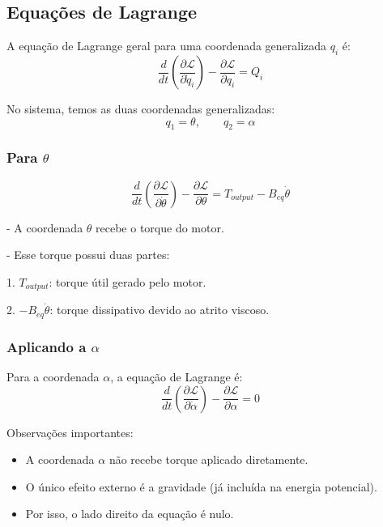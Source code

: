 \documentclass[9pt,a4paper,twocolumn,twoside]{tau-class/tau}
\begin{document}
\subsection{Equações de Lagrange}

A equação de Lagrange geral para uma coordenada generalizada $q_i$ é:
\begin{equation}
    \frac{d}{dt}\left(\frac{\partial \mathcal{L}}{\partial \dot{q}_i}\right)
    - \frac{\partial \mathcal{L}}{\partial q_i} = Q_i
\end{equation}

No sistema, temos as duas coordenadas generalizadas:
\[
q_1 = \theta, \qquad q_2 = \alpha
\]



\subsubsection*{Para $\theta$}
\begin{equation}
    \frac{d}{dt}\left(\frac{\partial \mathcal{L}}{\partial \dot{\theta}}\right)
    - \frac{\partial \mathcal{L}}{\partial \theta}
    = T_{output} - B_{eq}\dot{\theta}
\end{equation}

- A coordenada $\theta$ recebe o torque do motor. 

- Esse torque possui duas partes:

    1. $T_{output}$: torque útil gerado pelo motor.  

    2. $-B_{eq}\dot{\theta}$: torque dissipativo devido ao atrito viscoso.  



\subsubsection*{Aplicando a $\alpha$}

Para a coordenada $\alpha$, a equação de Lagrange é:
\begin{equation}
    \frac{d}{dt}\left(\frac{\partial \mathcal{L}}{\partial \dot{\alpha}}\right)
    - \frac{\partial \mathcal{L}}{\partial \alpha} = 0
\end{equation}

\noindent
Observações importantes:
\begin{itemize}
    \item A coordenada $\alpha$ não recebe torque aplicado diretamente.
    \item O único efeito externo é a gravidade (já incluída na energia potencial).
    \item Por isso, o lado direito da equação é nulo.
\end{itemize}
\end{document}
